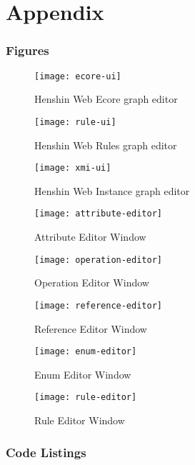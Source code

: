 \chapter{Appendix}
  \label{sec:appendix}

  \subsection{Figures}

  \begin{figure}[H]
    \centering
    \texttt{[image: ecore-ui]}
    \caption{Henshin Web Ecore graph editor}
    \label{fig:ecore-ui}
  \end{figure}

  \begin{figure}[H]
    \centering
    \texttt{[image: rule-ui]}
    \caption{Henshin Web Rules graph editor}
    \label{fig:rule-ui}
  \end{figure}

  \begin{figure}[H]
    \centering
    \texttt{[image: xmi-ui]}
    \caption{Henshin Web Instance graph editor}
    \label{fig:xmi-ui}
  \end{figure}

  \begin{figure}[h]
    \centering
    \texttt{[image: attribute-editor]}
    \caption{Attribute Editor Window}
    \label{fig:attribute-editor}
  \end{figure}
  \begin{figure}[h]
    \centering
    \texttt{[image: operation-editor]}
    \caption{Operation Editor Window}
    \label{fig:operation-editor}
  \end{figure}
  \begin{figure}[h]
    \centering
    \texttt{[image: reference-editor]}
    \caption{Reference Editor Window}
    \label{fig:reference-editor}
  \end{figure}
  \begin{figure}[h]
    \centering
    \texttt{[image: enum-editor]}
    \caption{Enum Editor Window}
    \label{fig:enum-editor}
  \end{figure}
    \begin{figure}[h]
    \centering
    \texttt{[image: rule-editor]}
    \caption{Rule Editor Window}
    \label{fig:rule-editor}
  \end{figure}

  \subsection{Code Listings}



    

